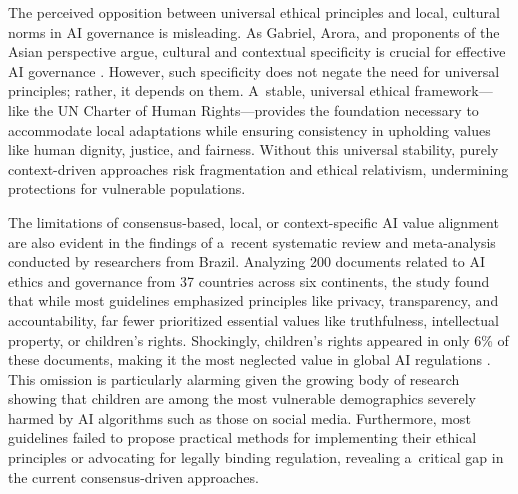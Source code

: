 \documentclass[%
  manuscript=article,
  year=2024,
  volume=77,
  doi=10.59203/zfn.77.707,
]{zfn}
\begin{document}
The perceived opposition between universal ethical principles and local, cultural norms in AI governance is misleading. As Gabriel, Arora, and proponents of the Asian perspective argue, cultural and contextual specificity is crucial for effective AI governance 
\parencites[][]{gabriel_artificial_2020}[][]{tam_incorporating_2023}[][]{arora_pessimism_2024}. %
 However, such specificity does not negate the need for universal principles; rather, it depends on them. A~stable, universal ethical framework---like the UN Charter of Human Rights---provides the foundation necessary to accommodate local adaptations while ensuring consistency in upholding values like human dignity, justice, and fairness. Without this universal stability, purely context-driven approaches risk fragmentation and ethical relativism, undermining protections for vulnerable populations.



The limitations of consensus-based, local, or context-specific AI value alignment are also evident in the findings of a~recent systematic review and meta-analysis conducted by researchers from Brazil. Analyzing 200 documents related to AI ethics and governance from 37 countries across six continents, the study found that while most guidelines emphasized principles like privacy, transparency, and accountability, far fewer prioritized essential values like truthfulness, intellectual property, or children's rights. Shockingly, children's rights appeared in only 6\% of these documents, making it the most neglected value in global AI regulations 
\parencite[][]{correa_worldwide_2023}. %
 This omission is particularly alarming given the growing body of research showing that children are among the most vulnerable demographics severely harmed by AI algorithms such as those on social media. Furthermore, most guidelines failed to propose practical methods for implementing their ethical principles or advocating for legally binding regulation, revealing a~critical gap in the current consensus-driven approaches.
\end{document}
